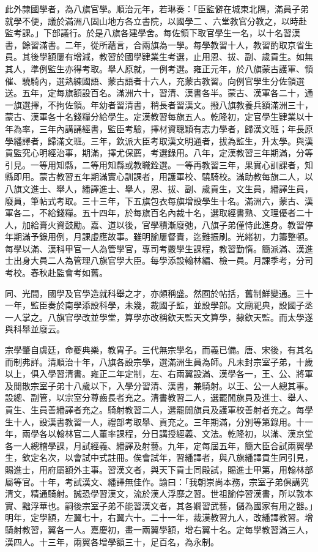 \begin{pinyinscope}
此外隸國學者，為八旗官學。順治元年，若琳奏：「臣監僻在城東北隅，滿員子弟就學不便，議於滿洲八固山地方各立書院，以國學二、六堂教官分教之，以時赴監考課。」下部議行。於是八旗各建學舍。每佐領下取官學生一名，以十名習漢書，餘習滿書。二年，從所蘊言，合兩旗為一學。每學教習十人，教習酌取京省生員。其後學額屢有增減，教習於國學肄業生考選，止用恩、拔、副、歲貢生。如無其人，準例監生亦得考取。舉人原就，一例考選。雍正元年，於八旗蒙古護軍、領催、驍騎內，選熟練國語、蒙古語者十六人，充蒙古教習。向例官學生分佐領選送。五年，定每旗額設百名。滿洲六十，習清、漢書各半。蒙古、漢軍各二十，通一旗選擇，不拘佐領。年幼者習清書，稍長者習漢文。撥八旗教養兵額滿洲三十，蒙古、漢軍各十名錢糧分給學生。定漢教習每旗五人。乾隆初，定官學生肄業以十年為率，三年內講誦經書，監臣考驗，擇材資聰穎有志力學者，歸漢文班；年長原學繙譯者，歸滿文班。三年，欽派大臣考取漢文明通者，拔為監生，升太學。與漢貢監究心明經治事，期滿，擇尤保薦，考選錄用。八年，定漢教習三年期滿，分等引見。一等用知縣，二等用知縣或教職銓選。一等再教習三年，果實心訓課者，知縣即用。蒙古教習五年期滿實心訓課者，用護軍校、驍騎校。滿助教每旗二人，以八旗文進士、舉人，繙譯進士、舉人，恩、拔、副、歲貢生，文生員，繙譯生員，廢員，筆帖式考取。三十三年，下五旗包衣每旗增設學生十名。滿洲六，蒙古、漢軍各二，不給錢糧。五十四年，於每旗百名內裁十名，選取經書熟、文理優者二十人，加給膏火資鼓勵。嘉、道以後，官學積漸廢弛，八旗子弟僅恃此進身。教習停年期滿予錄用例，月課虛應故事。雖明諭屢督責，迄難振刷。光緒初，力籌整頓。每學以滿、漢科甲官一人為管學官，專司考覈學生課程，教習勤惰。簡派滿、漢進士出身大員二人為管理八旗官學大臣。每學添設翰林編、檢一員。月課季考，分司考校。春秋赴監會考如舊。

同、光間，國學及官學造就科舉之才，亦頗稱盛。然囿於帖括，舊制鮮變通。三十一年，監臣奏於南學添設科學，未幾，裁國子監，並設學部。文廟祀典，設國子丞一人掌之。八旗官學改並學堂，算學亦改稱欽天監天文算學，隸欽天監。而太學遂與科舉並廢云。

宗學肇自虞廷，命夔典樂，教胄子。三代無宗學名，而義已備。唐、宋後，有其名而制弗詳。清順治十年，八旗各設宗學，選滿洲生員為師。凡未封宗室子弟，十歲以上，俱入學習清書。雍正二年定制，左、右兩翼設滿、漢學各一，王、公、將軍及閒散宗室子弟十八歲以下，入學分習清、漢書，兼騎射。以王、公一人總其事。設總、副管，以宗室分尊齒長者充之。清書教習二人，選罷閒旗員及進士、舉人、貢生、生員善繙譯者充之。騎射教習二人，選罷閒旗員及護軍校善射者充之。每學生十人，設漢書教習一人，禮部考取舉、貢充之。三年期滿，分別等第錄用。十一年，兩學各以翰林官二人董率課程，分日講授經義、文法。乾隆初，以滿、漢京堂各一人總稽學課，月試經義、繙譯及射藝。九年，定每屆五年，簡大臣合試兩翼學生，欽定名次，以會試中式註冊。俟會試年，習繙譯者，與八旗繙譯貢生同引見，賜進士，用府屬額外主事。習漢文者，與天下貢士同殿試，賜進士甲第，用翰林部屬等官。十年，考試漢文、繙譯無佳作。諭曰：「我朝崇尚本務，宗室子弟俱講究清文，精通騎射。誠恐學習漢文，流於漢人浮靡之習。世祖諭停習漢書，所以敦本實、黜浮華也。嗣後宗室子弟不能習漢文者，其各嫺習武藝，儲為國家有用之器。」明年，定學額，左翼七十，右翼六十。二十一年，裁漢教習九人，改繙譯教習。增騎射教習，翼各一人。嘉慶初，畫一兩翼學額，增右翼十名。定每學教習滿三人，漢四人。十三年，兩翼各增學額三十，足百名，為永制。


\end{pinyinscope}
